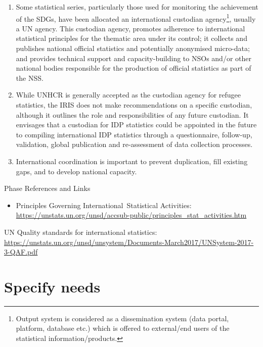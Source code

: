 \documentclass[
]{article}
\providecommand{\tightlist}{%
  \setlength{\itemsep}{0pt}\setlength{\parskip}{0pt}}
\begin{document}
\begin{enumerate}
\def\labelenumi{\arabic{enumi}.}
\setcounter{enumi}{19}
\item
  Some statistical series, particularly those used for monitoring the
  achievement of the SDGs, have been allocated an international
  custodian agency\footnote{Output system is considered as a dissemination system (data
    portal, platform, database etc.) which is offered to external/end
    users of the statistical information/products.}, usually a UN agency. This custodian agency,
  promotes adherence to international statistical principles for the
  thematic area under its control; it collects and publishes national
  official statistics and potentially anonymised micro-data; and
  provides technical support and capacity-building to NSOs and/or
  other national bodies responsible for the production of official
  statistics as part of the NSS.
\item
  While UNHCR is generally accepted as the custodian agency for
  refugee statistics, the IRIS does not make recommendations on a
  specific custodian, although it outlines the role and
  responsibilities of any future custodian. It envisages that a
  custodian for IDP statistics could be appointed in the future to
  compiling international IDP statistics through a questionnaire,
  follow-up, validation, global publication and re-assessment of data
  collection processes.
\item
  International coordination is important to prevent duplication, fill
  existing gaps, and to develop national capacity.
\end{enumerate}

Phase References and Links

\begin{itemize}
\tightlist
\item
  Principles Governing International~Statistical Activities:
  \url{https://unstats.un.org/unsd/accsub-public/principles_stat_activities.htm}
\end{itemize}

UN Quality standards for international statistics:
\url{https://unstats.un.org/unsd/unsystem/Documents-March2017/UNSystem-2017-3-QAF.pdf}

\hypertarget{specify-needs}{%
\section{Specify needs}\label{specify-needs}}
\end{document}
